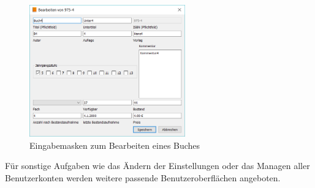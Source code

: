 \begin{figure}[H]
	\centering
	\includegraphics[width=0.60\textwidth]{figures/konzept/maske.PNG}
	\caption{Eingabemasken zum Bearbeiten eines Buches}
	\label{fig:maske}
\end{figure}
Für sonstige Aufgaben wie das Ändern der Einstellungen oder das Managen aller Benutzerkonten werden weitere passende Benutzeroberflächen angeboten.

